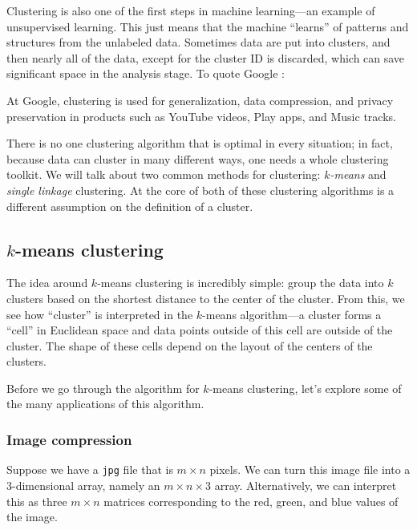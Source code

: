 \documentclass[a4paper, 12pt]{article}
\numberwithin{equation}{section}
\numberwithin{figure}{section}
\theoremstyle{definition}
\begin{document}
Clustering is also one of the first steps in machine learning---an example of
unsupervised learning. This just means that the machine ``learns'' of patterns
and structures from the unlabeled data. Sometimes data are put into clusters,
and then nearly all of the data, except for the cluster ID is discarded, which
can save significant space in the analysis stage. To quote Google \cite{Google}:

\begin{displayquote}
	At Google, clustering is used for generalization, data compression, and
	privacy preservation in products such as YouTube videos, Play apps, and
	Music tracks.
\end{displayquote}

There is no one clustering algorithm that is optimal in every situation; in
fact, because data can cluster in many different ways, one needs a whole
clustering toolkit. We will talk about two common methods for clustering:
\textit{$k$-means} and \textit{single linkage} clustering. At the core of both
of these clustering algorithms is a different assumption on the definition of a
cluster. 

\subsection{$k$-means clustering}

The idea around $k$-means clustering is incredibly simple: group the data into
$k$ clusters based on the shortest distance to the center of the cluster. From
this, we see how ``cluster'' is interpreted in the $k$-means algorithm---a
cluster forms a ``cell'' in Euclidean space and data points outside of this cell
are outside of the cluster. The shape of these cells depend on the layout of the
centers of the clusters. 

Before we go through the algorithm for $k$-means clustering, let's explore some
of the many applications of this algorithm. 

\subsubsection{Image compression}

Suppose we have a \texttt{jpg} file that is $m\times n$ pixels. We can turn this
image file into a $3$-dimensional array, namely an $m\times n\times 3$ array.
Alternatively, we can interpret this as three $m\times n$ matrices corresponding
to the red, green, and blue values of the image. 
\end{document}
